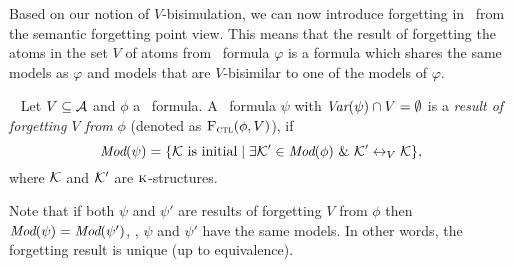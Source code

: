 \documentclass[letterpaper]{article}
\begin{document}
Based on our notion of $V$-bisimulation, we can now introduce forgetting in \CTL\ from the semantic forgetting point view.
This means that the result of forgetting the atoms in the set $V$ of atoms from \CTL\ formula $\varphi$ is a formula which shares the same models as $\varphi$ and models that are $V$-bisimilar to one of the models of $\varphi$.
\begin{definition}[Forgetting]~\cite{renyansfirstpaper}\label{def:V:forgetting}
  Let $V\subseteq\cal A$ and $\phi$ a \CTL\ formula.
A \CTL\ formula $\psi$ with $\textit{Var}(\psi)\cap V=\emptyset$
is a {\em result of forgetting $V$ from} $\phi$ (denoted as ${\textsc{F}_{\textsc{ctl}}}(\phi,V)$), if
\begin{equation*}
  \textit{Mod}(\psi)=\{{\cal K}\mbox{ is initial}\mid \exists {\cal K}'\in\textit{Mod}(\phi)\ \&\ {\cal K}'\leftrightarrow_V{\cal K}\},
\end{equation*}
where $\cal K$ and ${\cal K}'$ are $\textsc{k}$-structures.
\end{definition}
Note that if both $\psi$ and $\psi'$ are results of forgetting $V$ from $\phi$ then
$\textit{Mod}(\psi)=\textit{Mod}(\psi')$, \ie, $\psi$ and $\psi'$ have the same models. In other words,  the forgetting result is unique (up to equivalence).
\end{document}
